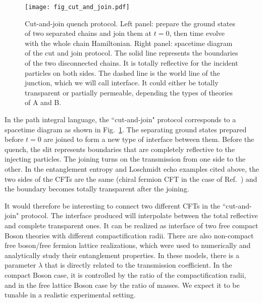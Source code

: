 \begin{figure}[h]
\texttt{[image: fig\_cut\_and\_join.pdf]}
\caption{Cut-and-join quench protocol. Left panel: prepare the ground states of two separated chains and join them at $t = 0$, then time evolve with the whole chain Hamiltonian. Right panel: spacetime diagram of the cut and join protocol. The solid line represents the boundaries of the two disconnected chains. It is totally reflective for the incident particles on both sides. The dashed line is the world line of the junction, which we will call interface. It could either be totally transparent or partially permeable, depending the types of theories of A and B.}
\label{fig:cut-and-join}
\end{figure}

In the path integral language, the ``cut-and-join" protocol corresponds to a spacetime diagram as shown in Fig.~\ref{fig:cut-and-join}. The separating ground states prepared before $t = 0$ are joined to form a new type of interface between them. Before the quench, the slit represents boundaries that are completely reflective to the injecting particles. The joining turns on the transmission from one side to the other. In the entanglement entropy and Loschmidt echo examples cited above\cite{calabrese_entanglement_2007, calabrese_quantum_2016, vasseur_universal_2014}, the two sides of the CFTs are the same (chiral fermion CFT in the case of Ref.~) and the boundary becomes totally transparent after the joining. 

It would therefore be interesting to connect two different CFTs in the ``cut-and-join" protocol. The interface produced will interpolate between the total reflective and complete transparent ones. It can be realized as interface of two free compact Boson theories with different compactification radii\cite{bachas_permeable_2002}. There are also non-compact free boson/free fermion lattice realizations, which were used to numerically and analytically\cite{peschel_exact_2012,sakai_entanglement_2008} study their entanglement properties. In these models, there is a parameter $\lambda$ that is directly related to the transmission coefficient. In the compact Boson case, it is controlled by the ratio of the compactification radii, and in the free lattice Boson case by the ratio of masses. We expect it to be tunable in a realistic experimental setting.

